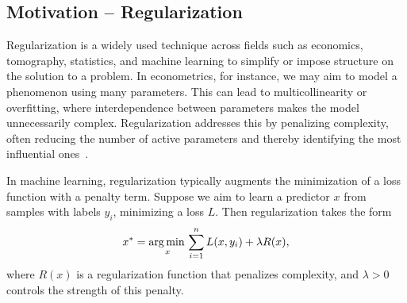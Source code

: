 \documentclass[11pt, twoside]{report}
\begin{document}
\subsection{Motivation -- Regularization}

Regularization is a widely used technique across fields such as economics, tomography, statistics, and machine learning to simplify or impose structure on the solution to a problem. In econometrics, for instance, we may aim to model a phenomenon using many parameters. This can lead to multicollinearity or overfitting, where interdependence between parameters makes the model unnecessarily complex. Regularization addresses this by penalizing complexity, often reducing the number of active parameters and thereby identifying the most influential ones~\cite{riskml}.

In machine learning, regularization typically augments the minimization of a loss function with a penalty term. Suppose we aim to learn a predictor $x$ from samples with labels $y_i$, minimizing a loss $L$. Then regularization takes the form
\begin{equation} \label{reg_ml}
    x^* = \operatorname*{arg\, min \,}_x \sum_{i=1}^n L(x, y_i) + \lambda R(x),
\end{equation}
where $R(x)$ is a regularization function that penalizes complexity, and $\lambda > 0$ controls the strength of this penalty.
\end{document}
